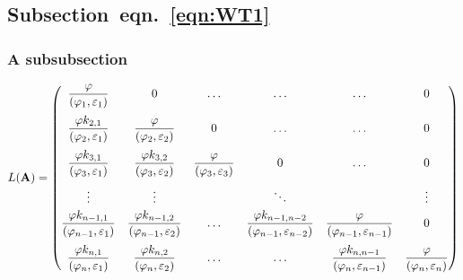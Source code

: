 \lipsum[4]

\subsection[Subsection~eqn.~(\ref*{eqn:WT1})]{Subsection~eqn.~\eqref{eqn:WT1}}
\lipsum[5-6]

\subsubsection{A subsubsection}
\lipsum[7]

\newcommand*{\boldA}{\ifpdftex\mathbf{A}\else\symbfup{A}\fi}%

\begin{equation}\label{eqn:WT1}
L(\boldA) = \begin{pmatrix}
\dfrac\varphi{(\varphi_1,\varepsilon_1)}			& 0 												 & \ldots 									& \ldots & \ldots& 0 \\[4\jot]
\dfrac{\varphi k_{2,1}}{(\varphi_2,\varepsilon_1)}	& \dfrac\varphi{(\varphi_2,\varepsilon_2)}			 & 0 										& \ldots & \ldots& 0 \\[4\jot]
\dfrac{\varphi k_{3,1}}{(\varphi_3,\varepsilon_1)}	& \dfrac{\varphi k_{3,2}}{(\varphi_3,\varepsilon_2)} & \dfrac\varphi{(\varphi_3,\varepsilon_3)}	& 0 	 & \ldots& 0 \\[4\jot]
\vdots 												& \vdots 											 & \mbox{ } & \ddots & \mbox{ } & \vdots \\[\jot]
\dfrac{\varphi k_{n-1, 1}}{(\varphi_{n-1},\varepsilon_1)}		& \dfrac{\varphi k_{n-1, 2}}{(\varphi_{n-1},\varepsilon_2)} & \ldots & 
\dfrac{\varphi k_{n-1,n-2}}{(\varphi_{n-1},\varepsilon_{n-2})}	& \dfrac{\varphi}{(\varphi_{n-1},\varepsilon_{n-1})} 		& 0 \\[4\jot]
\dfrac{\varphi k_{n,1}}{(\varphi_n,\varepsilon_1)}				& \dfrac{\varphi k_{n,2}}{(\varphi_n,\varepsilon_2)}		& \ldots & \ldots	&
\dfrac{\varphi k_{n,n-1}}{(\varphi_n,\varepsilon_{n-1})} 		& \dfrac{\varphi}{(\varphi_n,\varepsilon_n)}
\end{pmatrix}
\end{equation}

